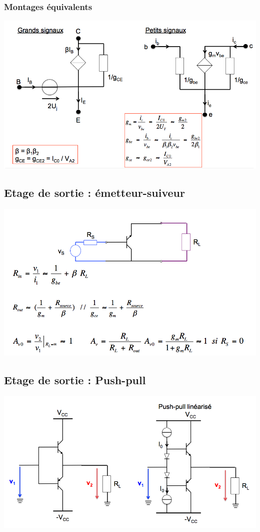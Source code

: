 \documentclass[]{article}
\begin{document}
\subsubsection{Montages équivalents}
\includegraphics[scale=0.7]{dareq}

\subsection{Etage de sortie : émetteur-suiveur}
\includegraphics[scale=0.7]{eds_emsuiv}
\subsection{Etage de sortie : Push-pull}
\includegraphics[scale=0.7]{eds_pp}
\end{document}
